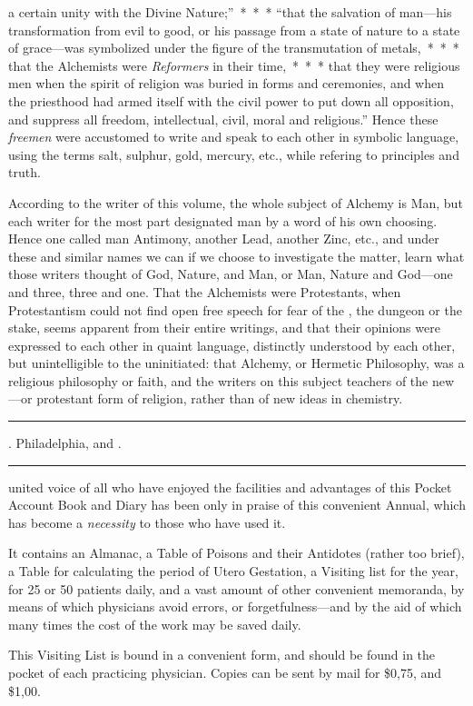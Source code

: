 a certain unity with the Divine Nature;''~*~*~* ``that the salvation
of man---his transformation from evil to good, or his passage from
a state of nature to a state of grace---was symbolized under the figure
of the transmutation of metals,~*~*~* that the Alchemists were
\emph{Reformers} in their time,~*~*~* that they were religious men when
the spirit of religion was buried in forms and ceremonies, and when
the priesthood had armed itself with the civil power to put down all
opposition, and suppress all freedom, intellectual, civil, moral and religious.''
Hence these \emph{freemen} were accustomed to write and speak
to each other in symbolic language, using the terms salt, sulphur, gold,
mercury, etc., while refering to principles and truth.

According to the writer of this volume, the whole subject of Alchemy
is Man, but each writer for the most part designated man by a word of
his own choosing. Hence one called man Antimony, another Lead,
another Zinc, etc., and under these and similar names we can if we
choose to investigate the matter, learn what those writers thought of
God, Nature, and Man, or Man, Nature and God---one and three, three
and one. That the Alchemists were Protestants, when Protestantism
could not find open free speech for fear of the , the dungeon
or the stake, seems apparent from their entire writings, and that their
opinions were expressed to each other in quaint language, distinctly
understood by each other, but unintelligible to the uninitiated: that
Alchemy, or Hermetic Philosophy, was a religious philosophy or faith,
and the writers on this subject teachers of the new---or protestant form
of religion, rather than of new ideas in chemistry.

\fancybreak{* * *}

\footnotesize
{}. Philadelphia,
 and .
\plainbreak{1}
\normalsize


 united voice of all who have enjoyed the facilities and advantages
of this Pocket Account Book and Diary has been only in praise
of this convenient Annual, which has become a \emph{necessity} to those who
have used it.

It contains an Almanac, a Table of Poisons and their Antidotes
(rather too brief), a Table for calculating the period of Utero Gestation,
a Visiting list for the year, for 25 or 50 patients daily, and a vast
amount of other convenient memoranda, by means of which physicians
avoid errors, or forgetfulness---and by the aid of which many times
the cost of the work may be saved daily.

This Visiting List is bound in a convenient form, and should be found
in the pocket of each practicing physician. Copies can be sent by mail
for \$0,75, and \$1,00.\endinput
